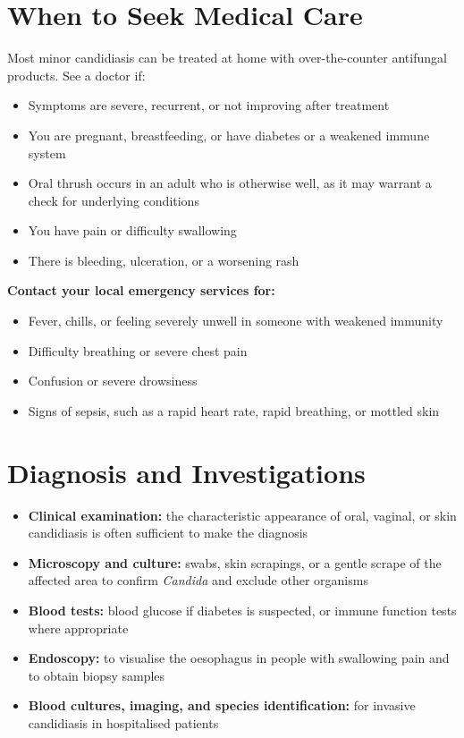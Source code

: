 \section*{When to Seek Medical Care}
Most minor candidiasis can be treated at home with over-the-counter antifungal products. See a doctor if:
\begin{itemize}
    \item Symptoms are severe, recurrent, or not improving after treatment
    \item You are pregnant, breastfeeding, or have diabetes or a weakened immune system
    \item Oral thrush occurs in an adult who is otherwise well, as it may warrant a check for underlying conditions
    \item You have pain or difficulty swallowing
    \item There is bleeding, ulceration, or a worsening rash
\end{itemize}
\textbf{Contact your local emergency services for:}
\begin{itemize}
    \item Fever, chills, or feeling severely unwell in someone with weakened immunity
    \item Difficulty breathing or severe chest pain
    \item Confusion or severe drowsiness
    \item Signs of sepsis, such as a rapid heart rate, rapid breathing, or mottled skin
\end{itemize}

\section*{Diagnosis and Investigations}
\begin{itemize}
    \item \textbf{Clinical examination:} the characteristic appearance of oral, vaginal, or skin candidiasis is often sufficient to make the diagnosis
    \item \textbf{Microscopy and culture:} swabs, skin scrapings, or a gentle scrape of the affected area to confirm \textit{Candida} and exclude other organisms
    \item \textbf{Blood tests:} blood glucose if diabetes is suspected, or immune function tests where appropriate
    \item \textbf{Endoscopy:} to visualise the oesophagus in people with swallowing pain and to obtain biopsy samples
    \item \textbf{Blood cultures, imaging, and species identification:} for invasive candidiasis in hospitalised patients
\end{itemize}

